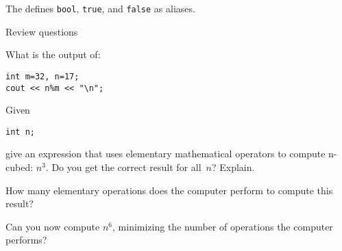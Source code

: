 
The  defines \lstinline{bool},
\lstinline{true}, and \lstinline{false} as aliases.

 {Review questions}

\begin{review}
  \label{ex:cpp-mod}
What is the output of:
\begin{lstlisting}
int m=32, n=17;
cout << n%m << "\n";
\end{lstlisting}
\end{review}

\begin{review}
  \label{ex:cpp-cube}
  Given
\begin{lstlisting}
int n;
\end{lstlisting}
give an expression that
uses elementary mathematical operators to compute n-cubed: $n^3$.
Do you get the correct result for all~$n$? Explain.

How many elementary operations does the computer perform to compute
this result?

Can you now compute $n^6$, minimizing the number of operations the
computer performs?
\end{review}
